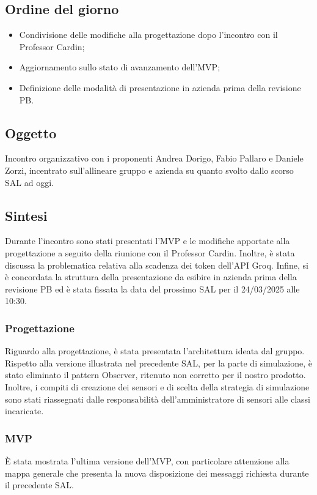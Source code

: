 \documentclass[10pt]{article}
\begin{document}
\subsection{Ordine del giorno}
\begin{itemize}
    \item Condivisione delle modifiche alla progettazione dopo l'incontro con il Professor Cardin;
    \item Aggiornamento sullo stato di avanzamento dell’MVP;
    \item Definizione delle modalità di presentazione in azienda prima della revisione PB.
\end{itemize}

\subsection{Oggetto}
Incontro organizzativo con i proponenti Andrea Dorigo, Fabio Pallaro e Daniele Zorzi, incentrato sull'allineare gruppo e azienda su quanto svolto dallo scorso SAL ad oggi.

\subsection{Sintesi}
Durante l'incontro sono stati presentati l’MVP e le modifiche apportate alla progettazione a seguito della riunione con il Professor Cardin. Inoltre, è stata discussa la problematica relativa alla scadenza dei token dell’API Groq. Infine, si è concordata la struttura della presentazione da esibire in azienda prima della revisione PB ed è stata fissata la data del prossimo SAL per il 24/03/2025 alle 10:30.

    \subsubsection{Progettazione}
    Riguardo alla progettazione, è stata presentata l'architettura ideata dal gruppo. Rispetto alla versione illustrata nel precedente SAL, per la parte di simulazione, è stato eliminato il pattern Observer, ritenuto non corretto per il nostro prodotto. Inoltre, i compiti di creazione dei sensori e di scelta della strategia di simulazione sono stati riassegnati dalle responsabilità dell'amministratore di sensori alle classi incaricate.
    
    \subsubsection{MVP}
    È stata mostrata l'ultima versione dell’MVP, con particolare attenzione alla mappa generale che presenta la nuova disposizione dei messaggi richiesta durante il precedente SAL.
\end{document}
